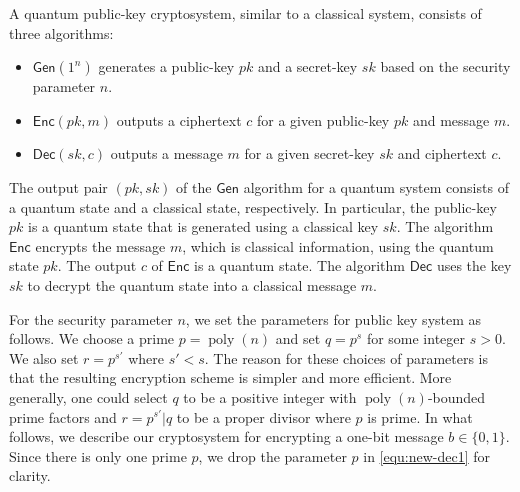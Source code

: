 \documentclass[11pt]{article}
\theoremstyle{plain}
\theoremstyle{definition}
\DeclareMathOperator{\poly}{poly}
\def\gen{\mathsf{Gen}}
\def\enc{\mathsf{Enc}}
\def\dec{\mathsf{Dec}}
\begin{document}
A quantum public-key cryptosystem, similar to a classical system, consists of three algorithms:
\begin{itemize}[itemsep = 1pt]
\item $\gen(1^n)$ generates a public-key $pk$ and a secret-key $sk$ based on the security parameter $n$.
\item $\enc(pk, m)$ outputs a ciphertext $c$ for a given public-key $pk$ and message $m$.
\item $\dec(sk, c)$ outputs a message $m$ for a given secret-key $sk$ and ciphertext $c$.
\end{itemize}
The output pair $(pk, sk)$ of the $\gen$ algorithm for a quantum system consists  of a quantum state and a classical state, respectively. In particular, the public-key $pk$ is a quantum state that is generated using a classical key $sk$. The algorithm $\enc$ encrypts the message $m$, which is classical information, using the quantum state $pk$. The output $c$ of $\enc$ is a quantum state. The algorithm $\dec$ uses the key $sk$ to decrypt the quantum state into a classical message $m$.

For the security parameter $n$, we set the parameters for public key system as follows. We choose a prime $p = \poly(n)$ and set $q = p^s$ for some integer $s > 0$. We also set $r = p^{s'}$ where $s' < s$. The reason for these choices of parameters is that the resulting encryption scheme is simpler and more efficient. More generally, one could select $q$ to be a positive integer with $\poly(n)$-bounded prime factors and $r = p^{s'} \vert q$ to be a proper divisor where $p$ is prime. In what follows, we describe our cryptosystem for encrypting a one-bit message $b \in \{ 0, 1 \}$. Since there is only one prime $p$, we drop the parameter $p$ in \eqref{equ:new-dec1} for clarity.
\end{document}
